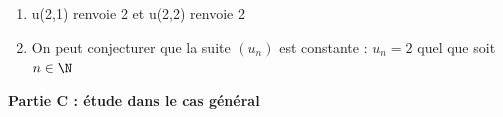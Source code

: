 \medskip

\begin{enumerate}
\item u(2,1) renvoie 2 et u(2,2) renvoie 2

%
\item %

On peut conjecturer que la suite $\left(u_n\right)$ est constante : $u_n = 2$ quel que soit $n \in \N$
\end{enumerate}

\bigskip

\textbf{Partie C : étude dans le cas général}

\medskip

